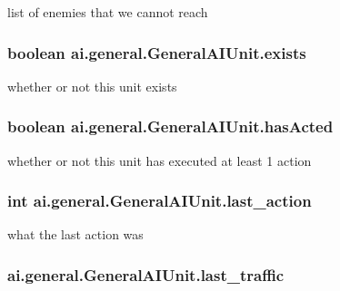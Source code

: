 list of enemies that we cannot reach \hypertarget{classai_1_1general_1_1_general_a_i_unit_a3268e3a735e33cc028a998cea762dd7d}{
\subsubsection[{exists}]{\setlength{\rightskip}{0pt plus 5cm}boolean {\bf ai.general.GeneralAIUnit.exists}}}
\label{classai_1_1general_1_1_general_a_i_unit_a3268e3a735e33cc028a998cea762dd7d}
whether or not this unit exists \hypertarget{classai_1_1general_1_1_general_a_i_unit_a32dd61d889729c4fb9dc639a5be4fd95}{
\subsubsection[{hasActed}]{\setlength{\rightskip}{0pt plus 5cm}boolean {\bf ai.general.GeneralAIUnit.hasActed}}}
\label{classai_1_1general_1_1_general_a_i_unit_a32dd61d889729c4fb9dc639a5be4fd95}
whether or not this unit has executed at least 1 action \hypertarget{classai_1_1general_1_1_general_a_i_unit_acd9867f2587b949768f67f3c38367275}{
\subsubsection[{last\_\-action}]{\setlength{\rightskip}{0pt plus 5cm}int {\bf ai.general.GeneralAIUnit.last\_\-action}}}
\label{classai_1_1general_1_1_general_a_i_unit_acd9867f2587b949768f67f3c38367275}
what the last action was \hypertarget{classai_1_1general_1_1_general_a_i_unit_a2c60d61b836e15fa9c579dc40a69c7fa}{
\subsubsection[{last\_\-traffic}]{ {\bf ai.general.GeneralAIUnit.last\_\-traffic}}}
